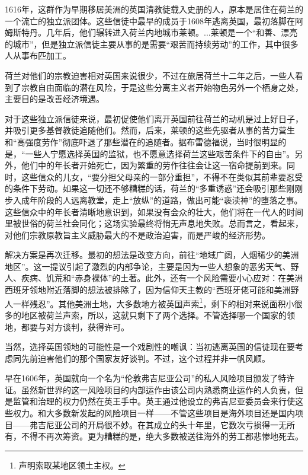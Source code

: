 \documentclass[12pt,oneside]{book}
\begin{document}
\begin{bookref}[frametitle={\cite{美国四百年}}]
1616年，这群作为早期移居美洲的英国清教徒载入史册的人，原本是居住在荷兰的一个流亡的独立派团体。这些信徒中最早的成员于1608年逃离英国，最初落脚在阿姆斯特丹。几年后，他们辗转进入荷兰内地城市莱顿。...莱顿是一个“和善、漂亮的城市”，但是独立派信徒主要从事的是需要“艰苦而持续劳动”的工作，其中很多人从事布匹加工。

荷兰对他们的宗教迫害相对英国来说很少，不过在旅居荷兰十二年之后，一些人看到了宗教自由面临的潜在风险，于是这些分离主义者开始物色另外一个栖身之处，主要目的是改善经济境遇。

对于这些独立派信徒来说，最初促使他们离开英国前往荷兰的动机是过上好日子，并吸引更多基督教徒追随他们。然而，后来，莱顿的这些先驱者从事的苦力营生和“高强度劳作”彻底吓退了那些潜在的追随者。据布雷德福说，当时很明显的是，“一些人宁愿选择英国的监狱，也不愿意选择荷兰这些艰苦条件下的自由”。另外，他们中的年长者开始死亡，因为繁重的劳作往往会让这一宿命提前到来。同时，这些信众的儿女，“要分担父母亲的一部分重担”，不得不在类似其前辈要忍受的条件下劳动。如果这一切还不够糟糕的话，荷兰的“多重诱惑”还会吸引那些刚刚步入成年阶段的人远离教堂，走上“放纵”的道路，做出可能“亵渎神”的堕落之事。这些信众中的年长者清晰地意识到，如果没有会众的壮大，他们将在一代人的时间里被世俗的荷兰社会同化；这场实验最终将悄无声息地失败。总而言之，看起来，对他们宗教原教旨主义威胁最大的不是政治迫害，而是严峻的经济形势。

解决方案是再次迁移。最初的想法是改变方向，前往“地域广阔，人烟稀少的美洲地区”。这一提议引起了激烈的内部争论，主要是因为一些人想象的恶劣天气、野人、疾病、饥荒和“赤身裸体”的土著。此外，还有一个风险需要小心应对：在美洲西班牙领地附近落脚的想法被排除了，因为信仰天主教的“西班牙佬可能和美洲野人一样残忍”。其他美洲土地，大多数地方被英国声索\footnote{声明索取某地区领土主权。}，剩下的相对来说面积小很多的地区被荷兰声索，所以，这就只剩下了两个选择。不管选择哪一个国家的领地，都要与对方谈判，获得许可。

当然，选择英国领地的可能性是一个戏剧性的嘲讽：当初逃离英国的信徒现在要考虑同先前迫害他们的那个国家友好谈判。不过，这个过程并非一帆风顺。

早在1606年，英国就向一个名为“伦敦弗吉尼亚公司”的私人风险项目颁发了特许证。虽然新世界的这一风险项目的内部运作由该公司内熟悉商业运作的人负责，但是监管和治理的权力仍然在英王手中。英王通过他设立的弗吉尼亚委员会来行使这些权力。和大多数新发起的风险项目一样——不管这些项目是海外项目还是国内项目——弗吉尼亚公司的开局很不妙。在其成立的头十年里，它数次亏损得一无所有，不得不再次筹资。更为糟糕的是，绝大多数被送往海外的劳工都悲惨地死去。


\end{bookref}
\end{document}
